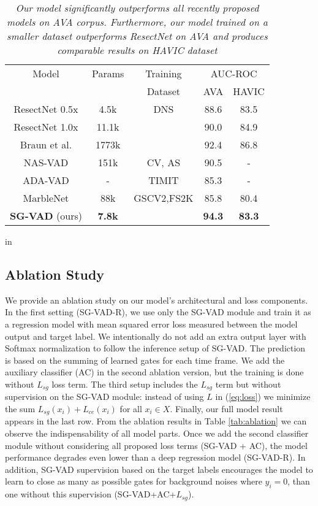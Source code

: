 \documentclass{article}
\begin{document}
\begin{table}[h!]
  \centering
  \small{
    \begin{tabular}{|c|c|c|c|c|}
    \hline
        Model & Params & Training & \multicolumn{2}{c|}{AUC-ROC}  \\
    
    & & Dataset & AVA & HAVIC\\
        \hline
       \hline
     ResectNet 0.5x \cite{kopuklu2022resectnet}& 4.5k & DNS  & 88.6 &  83.5 \\
    ResectNet 1.0x \cite{kopuklu2022resectnet} & 11.1k &  & 90.0 &  84.9 \\
    Braun et al. \cite{braun2021training} & 1773k &  & 92.4 & 86.8 \\
    \hline
    NAS-VAD \cite{rho2022vad} & 151k & CV, 
    AS & 90.5 & - \\
    \hline
    ADA-VAD \cite{kim2022ada}  & - & TIMIT  & 85.3 & - \\
    \hline
     MarbleNet \cite{jia2021marblenet} & 88k & GSCV2,FS2K & 85.8 & 80.4 \\
    \textbf{SG-VAD} (ours) & \textbf{7.8k} & & \textbf{94.3} & \textbf{83.3} \\
    \hline
    \end{tabular}
    }
  \caption{\textit{Our model significantly outperforms all recently proposed models on AVA corpus. Furthermore, our model trained on a smaller dataset outperforms ResectNet on AVA and produces comparable results on HAVIC dataset}} 
   \label{tab:results}
         in
\end{table}

\subsection{Ablation Study}
\label{sec:ablation}

We provide an ablation study on our model's architectural and loss components. In the first setting (SG-VAD-R), we use only the SG-VAD module and train it as a regression model with mean squared error loss measured between the model output and target label. We intentionally do not add an extra output layer with Softmax normalization to follow the inference setup of SG-VAD. The prediction is based on the summing of learned gates for each time frame.
We add the auxiliary classifier (AC) in the second ablation version, but the training is done without $L_{sg}$ loss term. The third setup includes the $L_{sg}$ term but without supervision on the SG-VAD module: instead of using $L$ in (\ref{eq:loss}) we minimize the sum $L_{sg}(x_i) + L_{ce}(x_i)$ for all $x_i \in X$. Finally, our full model result appears in the last row. From the ablation results in Table \ref{tab:ablation} we can observe the indispensability of all model parts. Once we add the second classifier module without considering all proposed loss terms (SG-VAD + AC), the model performance degrades even lower than a deep regression model (SG-VAD-R). In addition, SG-VAD supervision based on the target labels encourages the model to learn to close as many as possible gates for background noises where $y_i=0$, than one without this supervision (SG-VAD+AC+$L_{sg}$).
\end{document}
